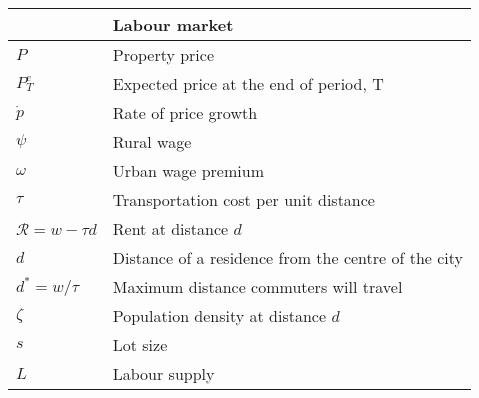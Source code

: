 \begin{longtable}{lp{10cm}}
\hline           &  \textbf{Labour market}      \\ \hline %
$P$              &  Property price              \\
$P^e_T$          &  Expected price at the end of period, T \\
$\dot p$         &  Rate of price growth        \\
$\psi$           &  Rural wage                  \\
$\omega$         &  Urban wage premium          \\
$\tau$           &  Transportation cost per unit distance \\
$\mathcal{R} = w-\tau d$ & Rent at distance $d$ \\ 
$d$              &  Distance of a residence from the centre of the city \\
$d^* = w/\tau$   &  Maximum distance commuters will travel \\ %
$\zeta$          &  Population density at distance $d$     \\
$s$              &  Lot size      \\
$L$              &  Labour supply \\ %


\end{longtable}

